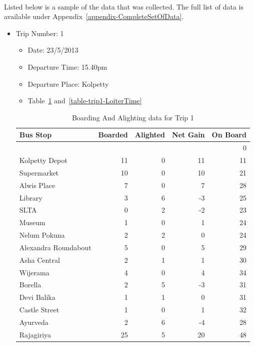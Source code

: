 \documentclass[12pt, oneside]{report}
\begin{document}
\paragraph{ } Listed below is a sample of the data that was collected. The full list of data is available under Appendix~\ref{appendix-CompleteSetOfData}.

\begin{itemize}

\item Trip Number: 1
\begin{itemize}
\item Date: 23/5/2013
\item Departure Time: 15.40pm
\item Departure Place: Kolpetty
\item Table~\ref{table-trip1-BoardingAndAlighting} and~\ref{table-trip1-LoiterTime}
\end{itemize}
\begin{table}[h!]
\centering
\begin{tabular}{|l|r|r|r|r|}
\hline
Bus Stop & Boarded & Alighted & Net Gain & On Board \\
\hline
 & & & & 0 \\
Kolpetty Depot	&11	&0	&11	&11\\
Supermarket	&10	&0	&10	&21\\
Alwis Place	&7	&0	&7	&28\\
Library	&3	&6	&-3	&25\\
SLTA	&0	&2	&-2	&23\\
\rowcolor[gray]{0.7}
Museum	&1	&0	&1	&24\\
Nelum Pokuna	&2	&2	&0	&24\\
\rowcolor[gray]{0.7}
Alexandra Roundabout	&5	&0	&5	&29\\
Asha Central	&2	&1	&1	&30\\
Wijerama	&4	&0	&4	&34\\
Borella	&2	&5	&-3	&31\\
Devi Balika	&1	&1	&0	&31\\
Castle Street	&1	&0	&1	&32\\
Ayurveda	&2	&6	&-4	&28\\
Rajagiriya	&25	&5	&20	&48\\
\hline
\end{tabular}
\caption{Boarding And Alighting data for Trip 1}
\label{table-trip1-BoardingAndAlighting}
\end{table}


\end{itemize}
\end{document}
